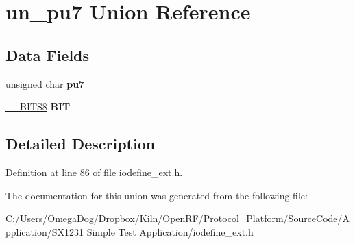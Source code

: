 \hypertarget{unionun__pu7}{\section{un\-\_\-pu7 Union Reference}
\label{unionun__pu7}
}
\subsection*{Data Fields}
\begin{DoxyCompactItemize}
\item 
\hypertarget{unionun__pu7_a2deee5e8cd2cae3f793a92f520672147}{unsigned char {\bfseries pu7}}\label{unionun__pu7_a2deee5e8cd2cae3f793a92f520672147}

\item 
\hypertarget{unionun__pu7_a57926dda677b2590109d362edd65b0c7}{\hyperlink{struct_____b_i_t_s8}{\-\_\-\-\_\-\-B\-I\-T\-S8} {\bfseries B\-I\-T}}\label{unionun__pu7_a57926dda677b2590109d362edd65b0c7}

\end{DoxyCompactItemize}


\subsection{Detailed Description}


Definition at line 86 of file iodefine\-\_\-ext.\-h.



The documentation for this union was generated from the following file\-:\begin{DoxyCompactItemize}
\item 
C\-:/\-Users/\-Omega\-Dog/\-Dropbox/\-Kiln/\-Open\-R\-F/\-Protocol\-\_\-\-Platform/\-Source\-Code/\-Application/\-S\-X1231 Simple Test Application/iodefine\-\_\-ext.\-h\end{DoxyCompactItemize}
